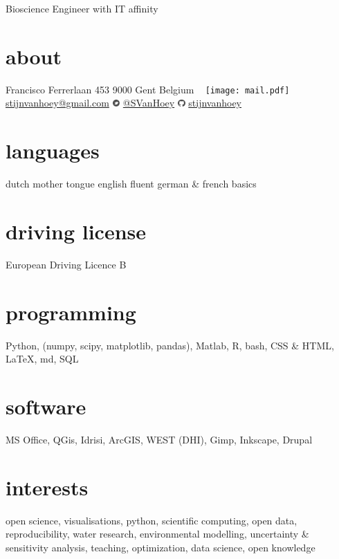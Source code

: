 \documentclass[]{stvhoey-cv}  %
\begin{document}
       {Bioscience Engineer with IT affinity}%

\begin{aside}
  \section{about}
    Francisco Ferrerlaan 453
    9000 Gent
    Belgium
    ~
    \texttt{[image: mail.pdf]}   \href{mailto:stijnvanhoey@gmail.com}{stijnvanhoey@gmail.com} 
    	\includegraphics[height=8pt]{twitter.pdf} \href{https://twitter.com/svanhoey}{@SVanHoey}
	\includegraphics[height=8pt]{github.pdf} \href{http://github.com/stijnvanhoey}{stijnvanhoey}%
  \section{languages}
    dutch mother tongue
    english fluent
   german \&  french basics
  \section{driving license}
  European Driving
  Licence B
  \section{programming}
   Python, %
    (numpy, scipy,
    matplotlib, pandas),
    Matlab, R, bash,
    CSS \& HTML,
    \LaTeX, md,
    SQL
  \section{software}
   MS Office,
   QGis, Idrisi, ArcGIS,
   WEST (DHI),
   Gimp, Inkscape,
   Drupal
\end{aside}
   
\section{interests}
open science, visualisations, python, scientific computing, open data, reproducibility, water research, environmental modelling, uncertainty \& sensitivity analysis, teaching, optimization, data science, open knowledge \vspace{\baselineskip}
\end{document}
